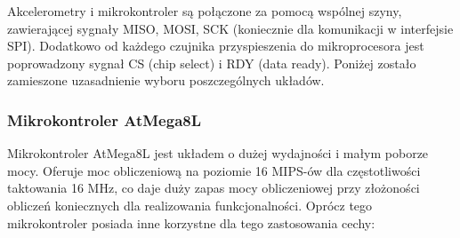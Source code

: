 Akcelerometry i mikrokontroler są połączone za pomocą wspólnej szyny, zawierającej sygnały MISO, MOSI, SCK (koniecznie dla komunikacji w interfejsie SPI). Dodatkowo od każdego czujnika przyspieszenia do mikroprocesora jest poprowadzony sygnał CS (chip select) i RDY (data ready).
Poniżej zostało zamieszone uzasadnienie wyboru poszczególnych układów.

\subsubsection{Mikrokontroler AtMega8L}
Mikrokontroler AtMega8L jest układem o dużej wydajności i małym poborze mocy. Oferuje moc obliczeniową na poziomie 16 MIPS-ów dla częstotliwości taktowania 16 MHz, co daje duży zapas mocy obliczeniowej przy złożoności obliczeń koniecznych dla realizowania funkcjonalności. 
Oprócz tego mikrokontroler posiada inne korzystne dla tego zastosowania cechy:
